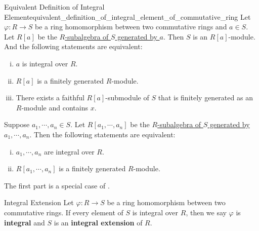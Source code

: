 \begin{proposition}{Equivalent Definition of Integral Element}{equivalent_definition_of_integral_element_of_commutative_ring}
    Let $\varphi:R\to S$ be a ring homomorphism between two commutative rings and $a\in S$. Let $R[a]$ be the \hyperref[th:generated_commutative_subalgebra]{$R$-subalgebra of $S$ generated by $a$}. Then $S$ is an $R[a]$-module. And the following statements are equivalent:
    \begin{enumerate}[(i)]
        \item $a$ is integral over $R$.
        \item $R[a]$ is a finitely generated $R$-module.
        \item There exists a faithful $R[a]$-submodule of $S$ that is finitely generated as an $R$-module and contains $x$.
    \end{enumerate}
    Suppose $a_1,\cdots,a_n\in S$. Let $R[a_1,\cdots,a_n]$ be the \hyperref[th:generated_commutative_subalgebra]{$R$-subalgebra of $S$ generated by $a_1,\cdots,a_n$}. Then the following statements are equivalent:
    \begin{enumerate}[(i)]
        \item $a_1,\cdots,a_n$ are integral over $R$.
        \item $R[a_1,\cdots,a_n]$ is a finitely generated $R$-module.
    \end{enumerate}
\end{proposition}
\begin{prf}
    The first part is a special case of .
\end{prf}

\begin{definition}{Integral Extension}{}
    Let $\varphi:R\to S$ be a ring homomorphism between two commutative rings. If every element of $S$ is integral over $R$, then we say $\varphi$ is \textbf{integral} and $S$ is an \textbf{integral extension} of $R$.
\end{definition}

